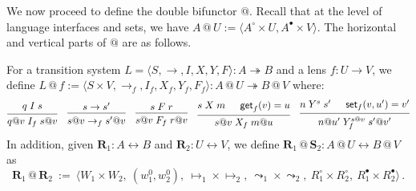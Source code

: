 \documentclass[acmsmall,screen,review,anonymous]{acmart}
\newcommand{\kw}[1]{\ensuremath{ \mathsf{#1} }}
\newcommand{\que}{\circ}
\newcommand{\ans}{\bullet}
\newcommand{\intl}[1]{#1^0}
\begin{document}
We now proceed to define the double bifunctor $\mathbin@$.
Recall that at the level of language interfaces and sets,
we have $A \mathbin@ U := \langle A^\que \times U, A^\ans \times V \rangle$.
The horizontal and vertical parts of $\mathbin@$ are as follows.

\begin{definition} \label{def:lift} \label{def:sctens} %
For a transition system
$L = \langle S, {\rightarrow}, I, X, Y, F \rangle : A \twoheadrightarrow B$
and a lens $f : U \rightarrow V$,
we define
$L \mathbin@ f :=
 \langle S \times V, {\rightarrow_f}, I_f, X_f, Y_f, F_f \rangle
 : A \mathbin@ U \twoheadrightarrow B \mathbin@ V$
where:
\begin{gather*}
 {\begin{prooftree}
    \hypo{q \mathrel{I} s}
    \infer1{q@v \mathrel{I_f} s@ v}
  \end{prooftree}}
  \quad
 {\begin{prooftree}
    \hypo{s \rightarrow s'}
    \infer1{s@v \rightarrow_f s'@v}
  \end{prooftree}}
  \quad
 {\begin{prooftree}
    \hypo{s \mathrel{F} r}
    \infer1{s@v \mathrel{F_f} r@v}
  \end{prooftree}}
  \quad
 {\begin{prooftree}
    \hypo{s \mathrel{X} m}
    \hypo{\kw{get}_f(v) = u}
    \infer2{s@v \mathrel{X_f} m@u}
  \end{prooftree}}
  \quad
 {\begin{prooftree}
    \hypo{n \mathrel{Y}^s s'}
    \hypo{\kw{set}_f(v, u') = v'}
    \infer2{n@u' \mathrel{Y^{s@v}_f} s'@v'}
  \end{prooftree}}
\end{gather*}
In addition,
given $\mathbf{R}_1 : A \leftrightarrow B$
and $\mathbf{R}_2 : U \leftrightarrow V$,
we define
$\mathbf{R}_1 \mathbin@ \mathbf{S}_2 :
 A \mathbin@ U \leftrightarrow B \mathbin@ V$
as
\[
  \mathbf{R}_1 \mathbin@ \mathbf{R}_2 \: := \:
    \big\langle
      W_1 \times W_2, \:
      (\intl{w}_1, \intl{w}_2), \:
      {\mapsto_1} \times {\mapsto_2}, \:
      {\leadsto_1} \times {\leadsto_2}, \:
      R_1^\que \times R_2^\que, \:
      R_1^\ans \times R_2^\ans
    \big\rangle
  \,.
\]
\end{definition}
\end{document}
